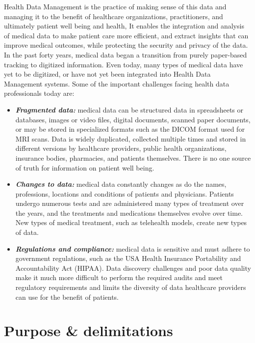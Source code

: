 Health Data Management is the practice of making sense of this data and managing it to the benefit of healthcare organizations, practitioners, and ultimately patient well being and health, It enables the integration and analysis of medical data to make patient care more efficient, and extract insights that can improve medical outcomes, while protecting the security and privacy of the data. In the past forty years, medical data began a transition from purely paper-based tracking to digitized information. Even today, many types of medical data have yet to be digitized, or have not yet been integrated into Health Data Management systems. Some of the important challenges facing health data professionals today are\cite{HealthDataManagement}:
\begin{itemize}
  \renewcommand{\labelitemi}{$\bullet$}
    \item \textbf{\textit{Fragmented data:}} medical data can be structured data in spreadsheets or databases, images or video files, digital documents, scanned paper documents, or may be stored in specialized formats such as the DICOM format used for MRI scans. Data is widely duplicated, collected multiple times and stored in different versions by healthcare providers, public health organizations, insurance bodies, pharmacies, and patients themselves. There is no one source of truth for information on patient well being.
    \item \textbf{\textit{Changes to data:}} medical data constantly changes as do the names, professions, locations and conditions of patients and physicians. Patients undergo numerous tests and are administered many types of treatment over the years, and the treatments and medications themselves evolve over time. New types of medical treatment, such as telehealth models, create new types of data.
    \item \textbf{\textit{Regulations and compliance:}} medical data is sensitive and must adhere to government regulations, such as the USA Health Insurance Portability and Accountability Act (HIPAA). Data discovery challenges and poor data quality make it much more difficult to perform the required audits and meet regulatory requirements and limits the diversity of data healthcare providers can use for the benefit of patients.
  \end{itemize}




\section{Purpose \& delimitations}

